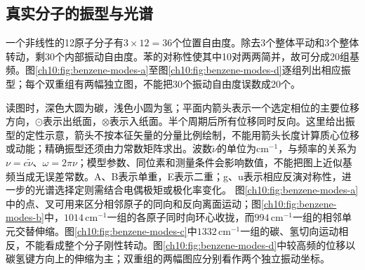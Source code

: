 \subsection{真实分子的振型与光谱}
一个非线性的12原子分子有$3\times12=36$个位置自由度。除去3个整体平动和3个整体转动，剩30个内部振动自由度。苯的对称性使其中10对两两简并，故可分成20组基频。图\ref{ch10:fig:benzene-modes-a}至图\ref{ch10:fig:benzene-modes-d}逐组列出相应振型；每个双重组有两幅独立图，不能把30个振动自由度误数成20个。

读图时，深色大圆为碳，浅色小圆为氢；平面内箭头表示一个选定相位的主要位移方向，$\odot$表示出纸面，$\otimes$表示入纸面。半个周期后所有位移同时反向。这里给出振型的定性示意，箭头不按本征矢量的分量比例绘制，不能用箭头长度计算质心位移或动能；精确振型还须由力常数矩阵求出。波数$\widetilde\nu$的单位为$\mathrm{cm^{-1}}$，与频率的关系为$\nu=c\widetilde\nu$、$\omega=2\pi\nu$；模型参数、同位素和测量条件会影响数值，不能把图上近似基频当成无误差常数。A、B表示单重，E表示二重；g、u表示相应反演对称性，进一步的光谱选择定则需结合电偶极矩或极化率变化。
图\ref{ch10:fig:benzene-modes-a}中的点、叉可用来区分相邻原子的同向和反向离面运动；图\ref{ch10:fig:benzene-modes-b}中，$1014\,\mathrm{cm^{-1}}$一组的各原子同时向环心收拢，而$994\,\mathrm{cm^{-1}}$一组的相邻单元交替伸缩。图\ref{ch10:fig:benzene-modes-c}中$1332\,\mathrm{cm^{-1}}$一组的碳、氢切向运动相反，不能看成整个分子刚性转动。图\ref{ch10:fig:benzene-modes-d}中较高频的位移以碳氢键方向上的伸缩为主；双重组的两幅图应分别看作两个独立振动坐标。
\newcommand{\chTenMolecule}[4]{%
\begin{tikzpicture}[scale=.55,>=Latex]
\foreach \j in {0,...,5}{\draw[TextGray]({60*\j}:1)--({60*(\j+1)}:1);\draw[TextGray]({60*\j}:1)--({60*\j}:1.7);}
\foreach \j in {0,...,5}{\draw[DeepBlue,thick]({60*\j}:1)circle(.10);\draw[TextGray]({60*\j}:1.7)circle(.075);}
\ifnum#1=0
 \foreach \v[count=\j from 0] in {#2}{\ifnum\v=0\else
 \node[font=\tiny,inner sep=0,fill=none]at({60*\j}:1){\ifnum\v>0$\cdot$\else$\times$\fi};\fi}
 \foreach \v[count=\j from 0] in {#3}{\ifnum\v=0\else
 \node[font=\tiny,inner sep=0,fill=none]at({60*\j}:1.7){\ifnum\v>0$\cdot$\else$\times$\fi};\fi}
\else
 \foreach \ang/\mag[count=\j from 0] in {#2}{\ifdim\mag pt=0pt\else\draw[DeepBlue,-{Latex[length=.8mm]},line width=.45pt]({60*\j}:1)++(\ang:.12)--++(\ang:{.45*max(.6,\mag)});\fi}
 \foreach \ang/\mag[count=\j from 0] in {#3}{\ifdim\mag pt=0pt\else\draw[DeepBlue,-{Latex[length=.8mm]},line width=.45pt]({60*\j}:1.7)++(\ang:.09)--++(\ang:{.42*max(.6,\mag)});\fi}
\fi
\path[use as bounding box](-2.5,-2.4)rectangle(2.5,2.4);
\end{tikzpicture}%
}
